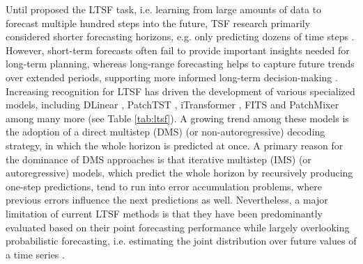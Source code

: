 \documentclass[a4paper,oneside,bibliography=totoc]{scrbook}
\begin{document}
\noindent
Until \citet{zhou_informer_2021} proposed the LTSF task, i.e. learning from large amounts of data to forecast multiple hundred steps into the future, TSF research primarily considered shorter forecasting horizons, e.g. only predicting dozens of time steps \cite{cirstea_triformer_2022}. 
However, short-term forecasts often fail to provide important insights needed for long-term planning, whereas long-range forecasting helps to capture future trends over extended periods, supporting more informed long-term decision-making \cite{jia_pgn_2024}.
Increasing recognition for LTSF has driven the development of various specialized models, including DLinear \cite{zeng_are_2023}, PatchTST \cite{nie_time_2022}, iTransformer \cite{liu_itransformer_2023}, FITS \cite{xu_fits_2023} and PatchMixer \cite{gong_patchmixer_2024} among many more (see Table \ref{tab:ltsf}).
A growing trend among these models is the adoption of a direct multistep (DMS) (or non-autoregressive) decoding strategy, in which the whole horizon is predicted at once.
A primary reason for the dominance of DMS approaches is that iterative multistep (IMS) (or autoregressive) models, which predict the whole horizon by recursively producing one-step predictions, tend to run into error accumulation problems, where previous errors influence the next predictions as well.
Nevertheless, a major limitation of current LTSF methods is that they have been predominantly evaluated based on their point forecasting performance while largely overlooking probabilistic forecasting, i.e. estimating the joint distribution over future values of a time series \cite{rasul_vq-tr_2023, zhang_probts_2024}. 
\newline
\end{document}
